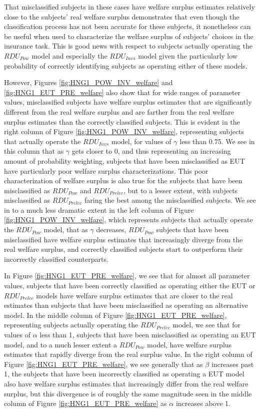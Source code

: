 \documentclass[../main.tex]{subfiles}
\begin{document}
That misclassified subjects in these cases have welfare surplus estimates relatively close to the subjects' real welfare surplus demonstrates that even though the classification process has not been accurate for these subjects, it nonetheless can be useful when used to characterize the welfare surplus of subjects' choices in the insurance task.
This is good news with respect to subjects actually operating the $\mathit{RDU_{Pow}}$ model and especially the $\mathit{RDU_{Invs}}$ model given the particularly low probability of correctly identifying subjects as operating either of these models.

However, Figures \ref{fig:HNG1_POW_INV_welfare} and \ref{fig:HNG1_EUT_PRE_welfare} also show that for wide ranges of parameter values, misclassified subjects have welfare surplus estimates that are significantly different from the real welfare surplus and are farther from the real welfare surplus estimates than the correctly classified subjects.
This is evident in the right column of Figure \ref{fig:HNG1_POW_INV_welfare}, representing subjects that actually operate the $\mathit{RDU_{Invs}}$ model, for values of $\gamma$ less than 0.75.
We see in this column that as $\gamma$ gets closer to 0, and thus representing an increasing amount of probability weighting, subjects that have been misclassified as EUT have particularly poor welfare surplus characterizations.
This poor characterization of welfare surplus is also true for the subjects that have been misclassified as $\mathit{RDU_{Pow}}$ and $\mathit{RDU_{Prelec}}$, but to a lesser extent, with subjects misclassified as $\mathit{RDU_{Prelec}}$ faring the best among the misclassified subjects.
We see in to a much less dramatic extent in the left column of Figure \ref{fig:HNG1_POW_INV_welfare}, which represents subjects that actually operate the $\mathit{RDU_{Pow}}$ model, that as $\gamma$ decreases, $\mathit{RDU_{Pow}}$ subjects that have been misclassified have welfare surplus estimates that increasingly diverge from the real welfare surplus, and correctly classified subjects start to outperform their incorrectly classified counterparts.

In Figure \ref{fig:HNG1_EUT_PRE_welfare}, we see that for almost all parameter values, subjects that have been correctly classified as operating either the EUT or $\mathit{RDU_{Prelec}}$ models have welfare surplus estimates that are closer to the real estimates than subjects that have been misclassified as operating an alternative model.
In the middle column of Figure \ref{fig:HNG1_EUT_PRE_welfare}, representing subjects actually operating the $\mathit{RDU_{Prelec}}$ model, we see that for values of $\alpha$ less than 1, subjects that have been misclassified as operating an EUT model, and to a much lesser extent a $\mathit{RDU_{Pow}}$ model, have welfare surplus estimates that rapidly diverge from the real surplus value.
In the right column of Figure \ref{fig:HNG1_EUT_PRE_welfare}, we see generally that as $\beta$ increases past 1, the subjects that have been incorrectly classified as operating a EUT model also have welfare surplus estimates that increasingly differ from the real welfare surplus, but this divergence is of roughly the same magnitude seen in the middle column of Figure \ref{fig:HNG1_EUT_PRE_welfare} as $\alpha$ increases above 1.
\end{document}
